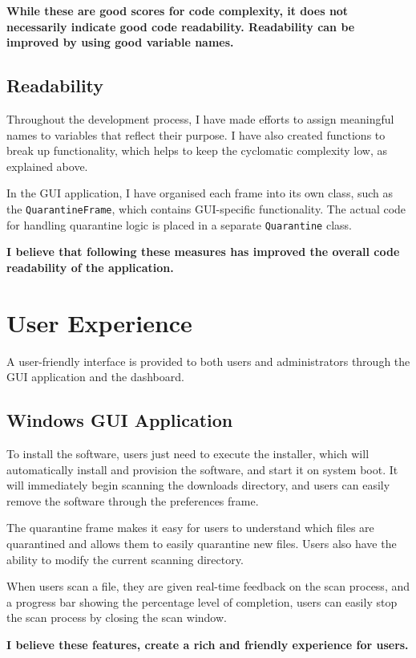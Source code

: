 \textbf{While these are good scores for code complexity,
it does not necessarily indicate good code readability.
Readability can be improved by using good variable names.}

\subsection{Readability}
Throughout the development process,
I have made efforts to assign meaningful names
to variables that reflect their purpose.
I have also created functions to break up functionality,
which helps to keep the cyclomatic complexity low, as explained above.

In the GUI application, I have organised each frame into its own class,
such as the \texttt{QuarantineFrame},
which contains GUI-specific functionality.
The actual code for handling quarantine logic
is placed in a separate \texttt{Quarantine} class.

\textbf{I believe that following these measures has improved
the overall code readability of the application.}

\section{User Experience}
A user-friendly interface is provided to both users and
administrators through the GUI application and the dashboard.

\subsection{Windows GUI Application}
To install the software, users just need to execute the installer,
which will automatically install and provision the software,
and start it on system boot.
It will immediately begin scanning the downloads directory,
and users can easily remove the software through the preferences frame.

The quarantine frame makes it easy for users to understand which
files are quarantined and allows them to easily quarantine new files.
Users also have the ability to modify the current scanning directory.

When users scan a file, they are given real-time feedback on the scan process,
and a progress bar showing the percentage level of completion,
users can easily stop the scan process by closing the scan window.

\textbf{I believe these features, create a rich and friendly experience for users.}

